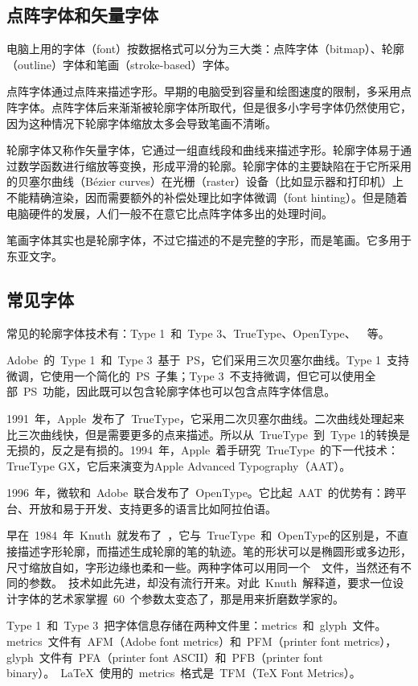 \subsection{点阵字体和矢量字体}
电脑上用的字体（font）按数据格式可以分为三大类：点阵字体（bitmap）、轮廓（outline）字体和笔画（stroke-based）字体。

点阵字体通过点阵来描述字形。早期的电脑受到容量和绘图速度的限制，多采用点阵字体。点阵字体后来渐渐被轮廓字体所取代，但是很多小字号字体仍然使用它，因为这种情况下轮廓字体缩放太多会导致笔画不清晰。

轮廓字体又称作矢量字体，它通过一组直线段和曲线来描述字形。轮廓字体易于通过数学函数进行缩放等变换，形成平滑的轮廓。轮廓字体的主要缺陷在于它所采用的贝塞尔曲线（Bézier curves）在光栅（raster）设备（比如显示器和打印机）上不能精确渲染，因而需要额外的补偿处理比如字体微调（font hinting）。但是随着电脑硬件的发展，人们一般不在意它比点阵字体多出的处理时间。

笔画字体其实也是轮廓字体，不过它描述的不是完整的字形，而是笔画。它多用于东亚文字。

\subsection{常见字体}

常见的轮廓字体技术有：Type 1~和~Type 3、TrueType、OpenType、~\MF~等。

Adobe~的~Type 1~和~Type 3~基于~PS，它们采用三次贝塞尔曲线。Type 1~支持微调，它使用一个简化的~PS~子集；Type 3~不支持微调，但它可以使用全部~PS~功能，因此既可以包含轮廓字体也可以包含点阵字体信息。
    
1991~年，Apple~发布了~TrueType，它采用二次贝塞尔曲线。二次曲线处理起来比三次曲线快，但是需要更多的点来描述。所以从~TrueType~到~Type 1的转换是无损的，反之是有损的。1994~年，Apple~着手研究~TrueType~的下一代技术：TrueType GX，它后来演变为Apple Advanced Typography（AAT）。

1996~年，微软和~Adobe~联合发布了~OpenType。它比起~AAT~的优势有：跨平台、开放和易于开发、支持更多的语言比如阿拉伯语。

早在~1984~年~Knuth~就发布了~\MF，它与~TrueType~和~OpenType的区别是，不直接描述字形轮廓，而描述生成轮廓的笔的轨迹。笔的形状可以是椭圆形或多边形，尺寸缩放自如，字形边缘也柔和一些。两种字体可以用同一个~\MF~文件，当然还有不同的参数。\MF~技术如此先进，却没有流行开来。对此~Knuth~解释道，要求一位设计字体的艺术家掌握~60~个参数太变态了，那是用来折磨数学家的。

Type 1~和~Type 3~把字体信息存储在两种文件里：metrics~和~glyph~文件。metrics~文件有~AFM（Adobe font metrics）和~PFM（printer font metrics），glyph~文件有~PFA（printer font ASCII）和~PFB（printer font binary）。~\LaTeX~使用的~metrics~格式是~TFM（TeX Font Metrics）。


